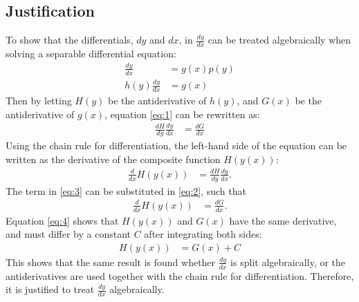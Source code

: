 \subsection{Justification} 
To show that the differentials, $dy$ and $dx$, in $\frac{dy}{dx}$ can be treated algebraically when solving a separable differential equation:
 \begin{align}
	\frac{dy}{dx} &= g(x)p(y)\nonumber\\
	h(y)\frac{dy}{dx} &= g(x)\label{eq:1}
 \end{align}
Then by letting $H(y)$ be the antiderivative of $h(y)$, and $G(x)$ be the antiderivative of $g(x)$, equation \eqref{eq:1} can be rewritten as: 
 \begin{align}
 	\frac{dH}{dy}\frac{dy}{dx} &= \frac{dG}{dx}\label{eq:2}
 \end{align}
Using the chain rule for differentiation, %
the left-hand side of the equation can be written as the derivative of the composite function $H(y(x))$:
 \begin{align}
	\frac{d}{dx} H(y(x)) &= \frac{dH}{dy}\frac{dy}{dx}.
	\label{eq:3}
 \end{align}
The term in \eqref{eq:3} can be substituted in \eqref{eq:2}, such that
 \begin{align}
 	\frac{d}{dx}H(y(x)) &= \frac{dG}{dx}\label{eq:4}.
 \end{align}
Equation \eqref{eq:4} shows that $H(y(x))$ and $G(x)$ have the same derivative, and must differ by a constant $C$ after integrating both sides:
 \begin{align*}
 	H(y(x)) &= G(x) + C
 \end{align*}
This shows that the same result is found whether $\frac{dy}{dx}$ is split algebraically, or the antiderivatives are used together with the chain rule for differentiation. Therefore, it is justified to treat $\frac{dy}{dx}$ algebraically.


